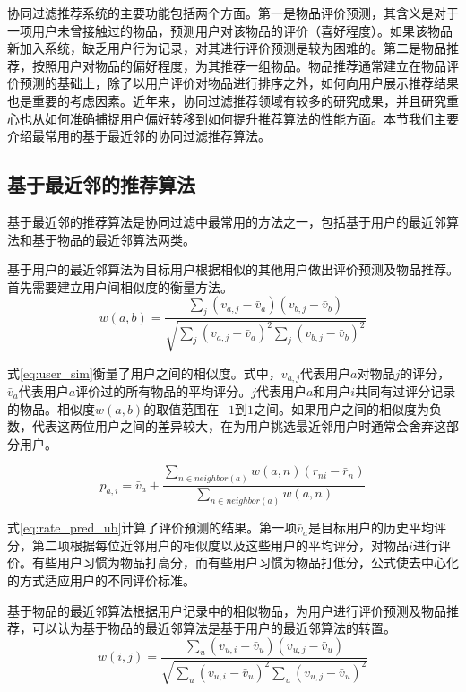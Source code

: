 协同过滤推荐系统的主要功能包括两个方面。第一是物品评价预测，其含义是对于一项用户未曾接触过的物品，预测用户对该物品的评价（喜好程度）。如果该物品新加入系统，缺乏用户行为记录，对其进行评价预测是较为困难的。第二是物品推荐，按照用户对物品的偏好程度，为其推荐一组物品。物品推荐通常建立在物品评价预测的基础上，除了以用户评价对物品进行排序之外，如何向用户展示推荐结果也是重要的考虑因素。近年来，协同过滤推荐领域有较多的研究成果，并且研究重心也从如何准确捕捉用户偏好转移到如何提升推荐算法的性能方面。本节我们主要介绍最常用的基于最近邻的协同过滤推荐算法。


\subsection{基于最近邻的推荐算法}
基于最近邻的推荐算法是协同过滤中最常用的方法之一，包括基于用户的最近邻算法和基于物品的最近邻算法两类。

基于用户的最近邻算法为目标用户根据相似的其他用户做出评价预测及物品推荐。首先需要建立用户间相似度的衡量方法。
\begin{equation}
\label{eq:user_sim}
	w(a,b) = \frac{\sum_j(v_{a,j}-\bar{v}_a)(v_{b,j}-\bar{v}_b)}{\sqrt{\sum_j(v_{a,j}-\bar{v}_a)^2\sum_j(v_{b,j}-\bar{v}_b)^2}}
\end{equation}

式\ref{eq:user_sim}衡量了用户之间的相似度。式中，$v_{a,j}$代表用户$a$对物品$j$的评分，$\bar{v}_a$代表用户$a$评价过的所有物品的平均评分。$j$代表用户$a$和用户$i$共同有过评分记录的物品。相似度$w(a,b)$的取值范围在$-1$到$1$之间。如果用户之间的相似度为负数，代表这两位用户之间的差异较大，在为用户挑选最近邻用户时通常会舍弃这部分用户。

\begin{equation}
\label{eq:rate_pred_ub}
	p_{a,i} = \bar{v}_a + \frac{\sum_{n \in neighbor(a)}w(a,n)(r_{ni} - \bar{r}_n)}{\sum_{n \in neighbor(a)}w(a,n)}
\end{equation}

式\ref{eq:rate_pred_ub}计算了评价预测的结果。第一项$\bar{v}_a$是目标用户的历史平均评分，第二项根据每位近邻用户的相似度以及这些用户的平均评分，对物品$i$进行评价。有些用户习惯为物品打高分，而有些用户习惯为物品打低分，公式使去中心化的方式适应用户的不同评价标准。

基于物品的最近邻算法根据用户记录中的相似物品，为用户进行评价预测及物品推荐\cite{sarwar2001item}，可以认为基于物品的最近邻算法是基于用户的最近邻算法的转置。
\begin{equation}
\label{eq:item_sim}
	w(i,j) = \frac{\sum_u(v_{u,i}-\bar{v}_u)(v_{u,j}-\bar{v}_u)}{\sqrt{\sum_u(v_{u,i}-\bar{v}_u)^2\sum_u(v_{u,j}-\bar{v}_u)^2}}
\end{equation}

